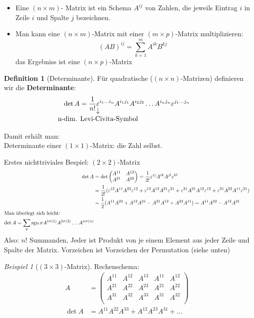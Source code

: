 \documentclass[a4paper]{scrartcl}
\DeclareMathOperator{\sgn}{sgn}
\theoremstyle{definition}
\newtheorem{defn}{Definition}
\theoremstyle{plain}
\theoremstyle{remark}
\theoremstyle{remark}
\newtheorem{ex}{Beispiel}
\newcommand{\eps}{\ensuremath{\varepsilon}}%
\begin{document}
\begin{itemize}
\item Eine $(n\times m)$- Matrix ist ein Schema $A^{ij}$ von Zahlen, die jeweils Eintrag $i$ in Zeile $i$ und Spalte $j$ bezeichnen.
\item Man kann eine $(n\times m)$-Matrix mit einer $(m\times p)$-Matrix multiplizieren:
\[(AB)^{ij} = \sum_{k = 1}^{m}A^{ik} B^{kj}\]
das Ergebniss ist eine $(n\times p)$-Matrix
\end{itemize}

\begin{defn}[Determinante]
Für quadratische ($(n\times n)$-Matrizen) definieren wir die \textbf{Determinante}:
\[\det A = \frac{1}{n!} \underarrow[\eps]{n-dim. Levi-Civita-Symbol}^{i_1 \ldots i_n} A^{i_1 j_1} A^{i_2 j_2} \ldots A^{i_n j_n} \eps^{j_1 \ldots j_n} \]

Damit erhält man: \\
   Determinante einer $(1\times 1)$-Matrix: die Zahl selbst.

Erstes nichttriviales Bespiel: $(2\times 2)$-Matrix
\begin{align*}
\det A &= \det \begin{pmatrix} A^{11} & A^{12} \\ A^{21} & A^{22}\end{pmatrix} = \frac{1}{2!} \eps^{ij} A^{ik} A^{jl} \eps^{kl} \\
&= \frac{1}{2!}(\eps^{12}A^{11}A^{22}\eps^{12} + \eps^{12}A^{12}A^{21}\eps^{21} + \eps^{21}A^{21}A^{12}\eps^{12} + \eps^{21}A^{22}A^{11}\eps^{21}) \\
&= \frac{1}{2} (A^{11} A^{22} + A^{12} A^{21} - A^{21}A^{12} + A^{22}A^{11}) = A^{11}A^{22} - A^{12}A^{21} \\
\intertext{Man überlegt sich leicht:}
\det A = \sum_{\sigma} \sgn{\sigma}A^{1\sigma(1)} A^{2\sigma(2)} \ldots A^{n\sigma(n)} \\
\end{align*}
Also: $n!$ Summanden, Jeder ist Produkt von je einem Element aus jeder Zeile und Spalte der Matrix. Vorzeichen ist Vorzeichen der Permutation (siehe unten)
\end{defn}
\begin{ex}[$(3\times 3)$-Matrix]
Rechenschema:
\begin{align*}
A&=\begin{pmatrix} A^{11} & A^{12} & A^{13} & A^{11} & A^{12} \\ A^{21} & A^{22} & A^{23} & A^{21} & A^{22} \\ A^{31} & A^{32} & A^{33} & A^{31} & A^{32} \\ \end{pmatrix} \\
\det A &= A^{11}A^{22}A^{33} + A^{12}A^{23}A^{31} + \ldots
\end{align*}
\end{ex}
\end{document}
